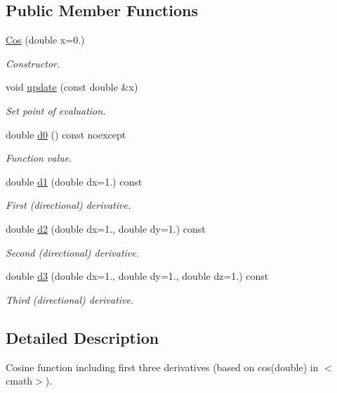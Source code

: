 \subsection*{Public Member Functions}
\begin{DoxyCompactItemize}
\item 
\hyperlink{structFunG_1_1Cos_a1c3c7f2efe426de2dab5bb4a307442ce}{Cos} (double x=0.)
\begin{DoxyCompactList}\small\item\em Constructor. \end{DoxyCompactList}\item 
void \hyperlink{structFunG_1_1Cos_a502c2a5f9f7e055e00192d185a5a0a50}{update} (const double \&x)
\begin{DoxyCompactList}\small\item\em Set point of evaluation. \end{DoxyCompactList}\item 
double \hyperlink{structFunG_1_1Cos_af1391a01b4031ebeb9a2db8127486127}{d0} () const noexcept
\begin{DoxyCompactList}\small\item\em Function value. \end{DoxyCompactList}\item 
double \hyperlink{structFunG_1_1Cos_a0d3494ce7fda10e3f64a2790d64c3b31}{d1} (double dx=1.) const 
\begin{DoxyCompactList}\small\item\em First (directional) derivative. \end{DoxyCompactList}\item 
double \hyperlink{structFunG_1_1Cos_ad48e6be302369c1fefbe29687823a617}{d2} (double dx=1., double dy=1.) const 
\begin{DoxyCompactList}\small\item\em Second (directional) derivative. \end{DoxyCompactList}\item 
double \hyperlink{structFunG_1_1Cos_abda328f29bee29f2af535c5f307de9c8}{d3} (double dx=1., double dy=1., double dz=1.) const 
\begin{DoxyCompactList}\small\item\em Third (directional) derivative. \end{DoxyCompactList}\end{DoxyCompactItemize}


\subsection{Detailed Description}
Cosine function including first three derivatives (based on cos(double) in $<$cmath$>$). 

